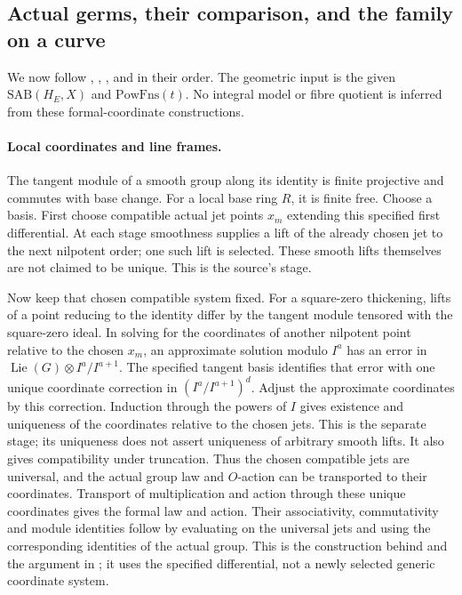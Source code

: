\subsection{Actual germs, their comparison, and the family on a curve}
\label{subsec:faithful-actual-family-construction}

We now follow , ,
, and 
in their order.  The geometric input is the given
\(\mathrm{SAB}(H_E,X)\) and \(\mathrm{PowFns}(t)\).
No integral model or fibre quotient is inferred from
these formal-coordinate constructions.

\paragraph{Local coordinates and line frames.}
The tangent module of a smooth group along its identity
is finite projective and commutes with base change.
For a local base ring \(R\), it is finite free.
Choose a basis.
First choose compatible actual jet points \(x_m\)
extending this specified first differential.
At each stage smoothness supplies a lift of the
already chosen jet to the next nilpotent order;
one such lift is selected.
These smooth lifts themselves are not claimed to be unique.
This is the source's
 stage.

Now keep that chosen compatible system fixed.
For a square-zero thickening, lifts of a point reducing
to the identity differ by the tangent module tensored
with the square-zero ideal.
In solving for the coordinates of another nilpotent
point relative to the chosen \(x_m\), an approximate
solution modulo \(I^a\) has an error in
\(\operatorname{Lie}(G)\otimes I^a/I^{a+1}\).
The specified tangent basis identifies that error with
one unique coordinate correction in
\((I^a/I^{a+1})^d\).
Adjust the approximate coordinates by this correction.
Induction through the powers of \(I\) gives existence
and uniqueness of the coordinates relative to the
chosen jets.
This is the separate
 stage;
its uniqueness does not assert uniqueness of arbitrary
smooth lifts.
It also gives compatibility under truncation.
Thus the chosen compatible jets are universal,
and the actual group law and \(O\)-action can be
transported to their coordinates.
Transport of multiplication and action through these
unique coordinates gives the formal law and action.
Their associativity, commutativity and module identities
follow by evaluating on the universal jets and using
the corresponding identities of the actual group.
This is the construction behind
 and the
 argument in
; it uses the specified
differential, not a newly selected generic coordinate system.

